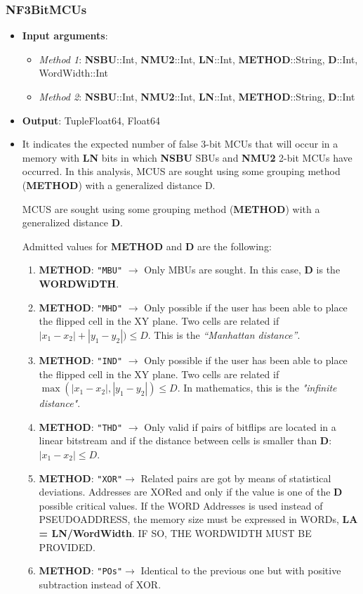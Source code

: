 \subsubsection*{NF3BitMCUs}\label{Fun:NF3BitMCUs}
%
\begin{itemize}
	\item \textbf{Input arguments}: 
	\begin{itemize}
		\item \textit{Method 1}: \textbf{NSBU}::Int, \textbf{NMU2}::Int, \textbf{LN}::Int, \textbf{METHOD}::String, \textbf{D}::Int, WordWidth::Int
		\item \textit{Method 2}: \textbf{NSBU}::Int, \textbf{NMU2}::Int, \textbf{LN}::Int, \textbf{METHOD}::String, \textbf{D}::Int
	\end{itemize}
	\item \textbf{Output}: Tuple{Float64, Float64}
	\item     It indicates the expected number of false 3-bit MCUs that will occur 	in a memory with \textbf{LN} bits in which \textbf{NSBU} SBUs and \textbf{NMU2} 2-bit MCUs have occurred. 	In this analysis, MCUS are sought using some grouping method (\textbf{METHOD}) with a generalized 
	distance D.
	
	MCUS are sought using some grouping method (\textbf{METHOD}) with a generalized distance \textbf{D}.
	
	Admitted values for \textbf{METHOD} and \textbf{D} are the following:
	
	\begin{enumerate}
	\item \textbf{METHOD}: \texttt{"MBU"} \(\rightarrow\) Only MBUs are sought. In this case, \textbf{D} is the \textbf{WORDWiDTH}.
	\item \textbf{METHOD}: \texttt{"MHD"} \(\rightarrow\)  Only possible if the user has been able to place the flipped	cell in the XY plane. Two cells are related if \(\left|x_1-x_2\right|+ \left|y_1-y_2\right|) \le D\). This  is the \textit{``Manhattan distance''}.
	\item \textbf{METHOD}: \texttt{"IND"} \(\rightarrow\)  Only possible if the user has been able to place the flipped	cell in the XY plane. Two cells are related if \(\max(\left|x_1-x_2\right|, \left|y_1-y_2\right|) \le D\). In mathematics, this is the \textit{"infinite distance"}.
	\item \textbf{METHOD}: \texttt{"THD"} \(\rightarrow\)  Only valid if pairs of bitflips are located in a linear bitstream and if the
	distance between cells is smaller than \textbf{D}: \(\left|x_1-x_2\right| \le D\).
	\item \textbf{METHOD}: \texttt{"XOR"}\(\rightarrow\)  Related pairs are got by means of statistical deviations. Addresses are XORed 
	and only if the value is one of the \textbf{D} possible critical values. If the WORD Addresses  
	is used instead of PSEUDOADDRESS, the memory size must be expressed in WORDs, \textbf{LA = LN/WordWidth}.
	IF SO, THE WORDWIDTH MUST BE PROVIDED.
	\item \textbf{METHOD}: \texttt{"POs"}\(\rightarrow\)  Identical to the previous one but with positive subtraction instead of XOR.
\end{enumerate}
	

\end{itemize}
